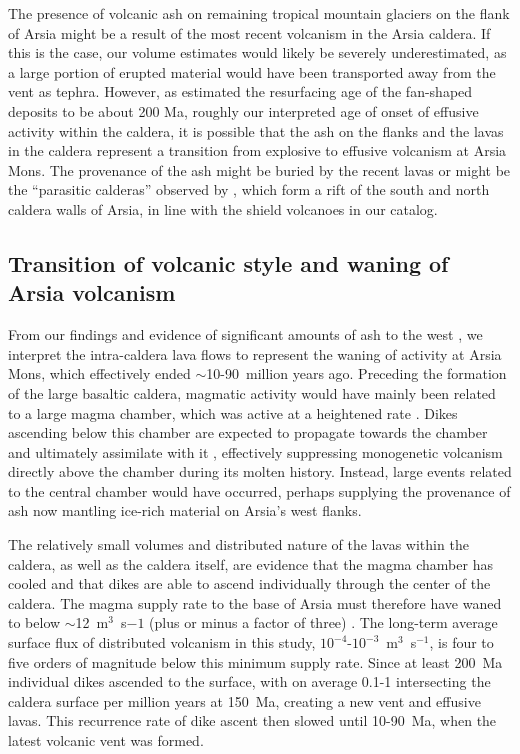 The presence of volcanic ash on remaining tropical mountain glaciers on the flank of Arsia might be a result of the most recent volcanism in the Arsia caldera. If this is the case, our volume estimates would likely be severely underestimated, as a large portion of erupted material would have been transported away from the vent as tephra. However, as \citet{kadish2014middle} estimated the resurfacing age of the fan-shaped deposits to be about 200 Ma, roughly our interpreted age of onset of effusive activity within the caldera, it is possible that the ash on the flanks and the lavas in the caldera represent a transition from explosive to effusive volcanism at Arsia Mons. The provenance of the ash might be buried by the recent lavas or might be the ``parasitic calderas'' observed by \citet{crumpler1996calderas}, which form a rift of the south and north caldera walls of Arsia, in line with the shield volcanoes in our catalog.

\subsection{Transition of volcanic style and waning of Arsia volcanism}
From our findings and evidence of significant amounts of ash to the west \citep{mouginis2002prodigious}, we interpret the intra-caldera lava flows to represent the waning of activity at Arsia Mons, which effectively ended $\sim$10-90~million years ago. Preceding the formation of the large basaltic caldera, magmatic activity would have mainly been related to a large magma chamber, which was active at a heightened rate \citep{wilson2001evidence}. Dikes ascending below this chamber are expected to propagate towards the chamber and ultimately assimilate with it \citep{karlstrom2009organization}, effectively suppressing monogenetic volcanism directly above the chamber during its molten history. Instead, large events related to the central chamber would have occurred, perhaps supplying the provenance of ash now mantling ice-rich material on Arsia's west flanks.

The relatively small volumes and distributed nature of the lavas within the caldera, as well as the caldera itself, are evidence that the magma chamber has cooled and that dikes are able to ascend individually through the center of the caldera. The magma supply rate to the base of Arsia must therefore have waned to below $\sim$12~m$^3$~s$-1$ (plus or minus a factor of three) \citep{wilson2001evidence}. The long-term average surface flux of distributed volcanism in this study, $10^{-4}$-$10^{-3}$~m$^3$~s$^{-1}$, is four to five orders of magnitude below this minimum supply rate. Since at least 200~Ma individual dikes ascended to the surface, with on average 0.1-1 intersecting the caldera surface per million years at 150~Ma, creating a new vent and effusive lavas. This recurrence rate of dike ascent then slowed until 10-90~Ma, when the latest volcanic vent was formed.

